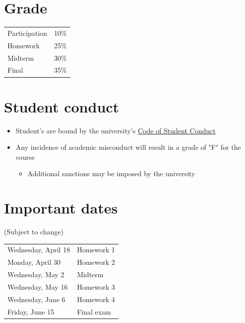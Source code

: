 \documentclass[11pt]{article}
\begin{document}
\section*{Grade}
\label{sec:orga0454ee}
\begin{center}
\begin{tabular}{ll}
Participation & 10\%\\
Homework & 25\%\\
Midterm & 30\%\\
Final & 35\%\\
\end{tabular}
\end{center}

\section*{Student conduct}
\label{sec:orgb66bd7c}
\begin{itemize}
\item Student's are bound by the university's \href{http://studentlife.oregonstate.edu/sites/studentlife.oregonstate.edu/files/code\_of\_student\_conduct.pdf}{Code of Student Conduct}
\item Any incidence of academic misconduct will result in a grade of "F" for the course 
\begin{itemize}
\item Additional sanctions may be imposed by the university
\end{itemize}
\end{itemize}

\section*{Important dates}
\label{sec:org5d68170}
(Subject to change)
\begin{center}
\begin{tabular}{ll}
Wednesday, April 18 & Homework 1\\
Monday, April 30 & Homework 2\\
Wednesday, May 2 & Midterm\\
Wednesday, May 16 & Homework 3\\
Wednesday, June 6 & Homework 4\\
Friday, June 15 & Final exam\\
\end{tabular}
\end{center}
\end{document}
